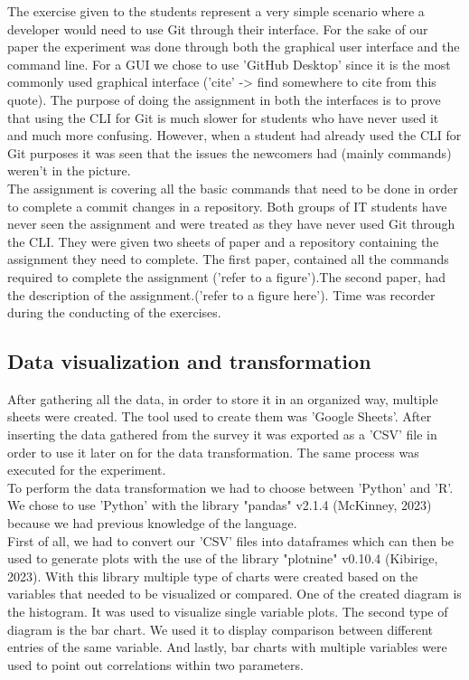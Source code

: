 \documentclass[]{report}
\begin{document}
	The exercise given to the students represent a very simple scenario where a developer would need to use Git through their interface. For the sake of our paper the experiment was done through both the graphical user interface and the command line. For a GUI we chose to use 'GitHub Desktop' since it is the most commonly used graphical interface ('cite' -> find somewhere to cite from this quote). The purpose of doing the assignment in both the interfaces is to prove that using the CLI for Git is much slower for students who have never used it and much more confusing. However, when a student had already used the CLI for Git purposes it was seen that the issues the newcomers had (mainly commands) weren't in the picture.\\
	
	The assignment is covering all the basic commands that need to be done in order to complete a commit changes in a repository. Both groups of IT students have never seen the assignment and were treated as they have never used Git through the CLI. They were given two sheets of paper and a repository containing the assignment they need to complete. The first paper, contained all the commands required to complete the assignment ('refer to a figure').The second paper, had the description of the assignment.('refer to a figure here'). Time was recorder during the conducting of the exercises.
	
	
	\subsection{Data visualization and transformation}
	After gathering all the data, in order to store it in an organized way, multiple sheets were created. The tool used to create them was 'Google Sheets'. After inserting the data gathered from the survey it was exported as a 'CSV' file in order to use it later on for the data transformation. The same process was executed for the experiment. \\
	
	To perform the data transformation we had to choose between 'Python' and 'R'. We chose to use 'Python' with the library "pandas" v2.1.4 (McKinney, 2023) because we had previous knowledge of the language. \\
	
	First of all, we had to convert our 'CSV' files into dataframes which can then be used to generate plots with the use of the library "plotnine" v0.10.4 (Kibirige, 2023).  With this library multiple type of charts were created based on the variables that needed to be visualized or compared. One of the created diagram is the histogram. It was used to visualize single variable plots. The second type of diagram is the bar chart. We used it to display comparison between different entries of the same variable. And lastly, bar charts with multiple variables were used to point out correlations within two parameters.
	
\end{document}
